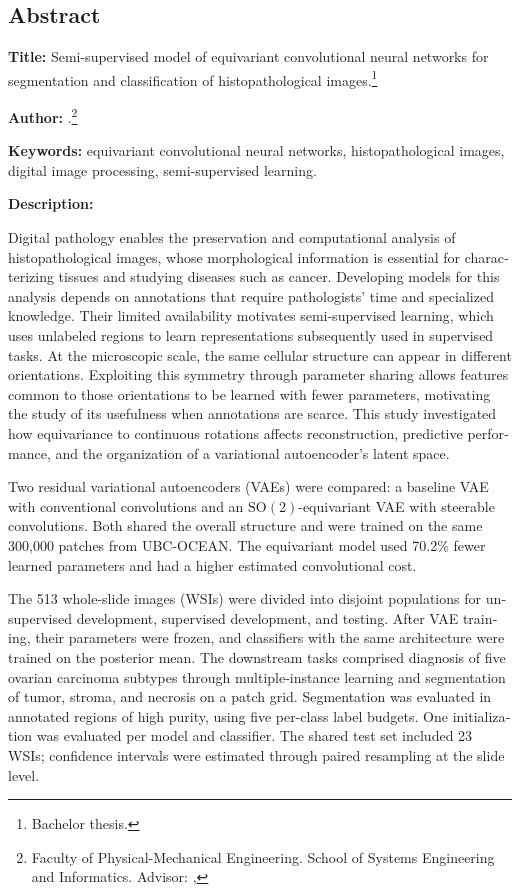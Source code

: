 \cleardoublepage
\begin{otherlanguage}{english}
\chapter*{Abstract}

\textbf{Title:} Semi-supervised model of equivariant convolutional neural networks for segmentation and classification of histopathological images.\footnote{Bachelor thesis.}

\textbf{Author:} \Author.\footnote{Faculty of Physical-Mechanical Engineering. School of Systems Engineering and Informatics. Advisor: \DirectorName, \DirectorDegree}

\textbf{Keywords:} equivariant convolutional neural networks, histopathological images, digital image processing, semi-supervised learning.

\textbf{Description:}

\begingroup\small

Digital pathology enables the preservation and computational analysis of
histopathological images, whose morphological information is essential for
characterizing tissues and studying diseases such as cancer. Developing models for this
analysis depends on annotations that require pathologists' time and specialized
knowledge. Their limited availability motivates semi-supervised learning, which uses
unlabeled regions to learn representations subsequently used in supervised tasks. At the
microscopic scale, the same cellular structure can appear in different orientations.
Exploiting this symmetry through parameter sharing allows features common to those
orientations to be learned with fewer parameters, motivating the study of its usefulness
when annotations are scarce. This study investigated how equivariance to continuous
rotations affects reconstruction, predictive performance, and the organization of a
variational autoencoder's latent space.

Two residual variational autoencoders (VAEs) were compared: a baseline VAE with
conventional convolutions and an \(\mathrm{SO}(2)\)-equivariant VAE with steerable convolutions.
Both shared the overall structure and were trained on the same 300,000 patches from
UBC-OCEAN. The equivariant model used 70.2\% fewer learned parameters and had a higher
estimated convolutional cost.

The 513 whole-slide images (WSIs) were divided into disjoint populations for
unsupervised development, supervised development, and testing. After VAE training, their
parameters were frozen, and classifiers with the same architecture were trained on the
posterior mean. The downstream tasks comprised diagnosis of five ovarian carcinoma
subtypes through multiple-instance learning and segmentation of tumor, stroma, and
necrosis on a patch grid. Segmentation was evaluated in annotated regions of high
purity, using five per-class label budgets. One initialization was evaluated per model
and classifier. The shared test set included 23 WSIs; confidence intervals were
estimated through paired resampling at the slide level.


\end{otherlanguage}
